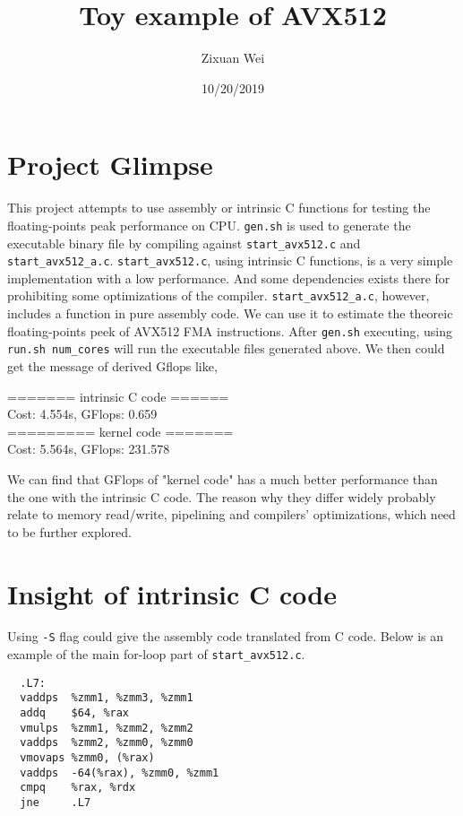 \documentclass[12pt, a4paper]{article}
\begin{document}
\title{Toy example of AVX512}
\author{Zixuan Wei}
\date{10/20/2019}
\maketitle

\section{Project Glimpse}
This project attempts to use assembly or intrinsic C functions for testing
the floating-points peak performance on CPU. \texttt{gen.sh} is
used to generate the executable binary file by compiling against
\texttt{start_avx512.c} and \texttt{start_avx512_a.c}.
\texttt{start_avx512.c}, using intrinsic C functions, is a very
simple implementation with a low performance. And some dependencies exists
there for prohibiting some optimizations of the compiler.
\texttt{start_avx512_a.c}, however, includes a function in pure
assembly code. We can use it to estimate the theoreic floating-points peek
of AVX512 FMA instructions.
After \texttt{gen.sh} executing, using \texttt{run.sh num_cores}
will run the executable files generated above. We then could get the message
of derived Gflops like,

\begin{tcolorbox}
======= intrinsic C code ======\\
Cost: 4.554s, GFlops: 0.659\\
========= kernel code =======\\
Cost: 5.564s, GFlops: 231.578
\end{tcolorbox}

We can find that GFlops of "kernel code" has a much better performance than
the one with the intrinsic C code. The reason why they differ widely probably
relate to memory read/write, pipelining and compilers' optimizations, which
need to be further explored.

\section{Insight of intrinsic C code}
Using \texttt{-S} flag could give the assembly code translated from
C code. Below is an example of the main for-loop part of \texttt{start_avx512.c}.

\begin{verbatim}
  .L7:
  vaddps  %zmm1, %zmm3, %zmm1
  addq    $64, %rax
  vmulps  %zmm1, %zmm2, %zmm2
  vaddps  %zmm2, %zmm0, %zmm0
  vmovaps %zmm0, (%rax)
  vaddps  -64(%rax), %zmm0, %zmm1
  cmpq    %rax, %rdx
  jne     .L7
\end{verbatim}
\end{document}
